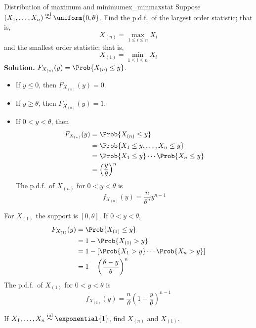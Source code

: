 \begin{Example}{Distribution of maximum and minimum}{ex_minmaxstat}
    Suppose $ (X_1,\ldots,X_n)\stackrel{\text{iid}}{\sim}\uniform{0,\theta} $.
    Find the p.d.f.\ of the largest order statistic; that is,
    \[ X_{(n)}=\max_{1\le i\le n} X_i \]
    and the smallest order statistic; that is,
    \[ X_{(1)}=\min_{1\le i\le n}X_i \]
    \textbf{Solution.} $ F_{X_{(n)}}(y)=\Prob{X_{(n)}\le y} $.
    \begin{itemize}
        \item If $ y\le 0 $, then $ F_{X_{(n)}}(y)=0 $.
        \item If $ y\ge \theta $, then $ F_{X_{(n)}}(y)=1 $.
        \item If $ 0<y<\theta $, then
              \begin{align*}
                  F_{X_{(n)}}(y)
                   & =\Prob{X_{(n)}\le y}                  \\
                   & =\Prob{X_1\le y,\ldots,X_n\le y}      \\
                   & =\Prob{X_1\le y}\cdots\Prob{X_n\le y} \\
                   & =\left( \frac{y}{\theta} \right)^n
              \end{align*}
              The p.d.f.\ of $ X_{(n)} $ for $ 0<y<\theta $ is
              \[ f_{X_{(n)}}(y)=\frac{n}{\theta^n}y^{n-1} \]
    \end{itemize}
    For $ X_{(1)} $ the support is $ [0,\theta] $. If $ 0<y<\theta $,
    \begin{align*}
        F_{X_{(1)}}(y)
         & =\Prob{X_{(1)}\le y}                              \\
         & =1-\Prob{X_{(1)}>y}                               \\
         & =1-\left[ \Prob{X_1>y}\cdots \Prob{X_n>y} \right] \\
         & =1-\left( \frac{\theta-y}{\theta}  \right)^n
    \end{align*}
    The p.d.f.\ of $ X_{(1)} $ for $ 0<y<\theta $ is
    \[ f_{X_{(1)}}(y)=\frac{n}{\theta} \left( 1-\frac{y}{\theta}  \right)^{n-1} \]
\end{Example}
\begin{Exercise}{}{}
    If $ X_1,\ldots,X_n \stackrel{\text{iid}}{\sim} \exponential{1} $,
    find $ X_{(n)} $ and $ X_{(1)} $.
\end{Exercise}
